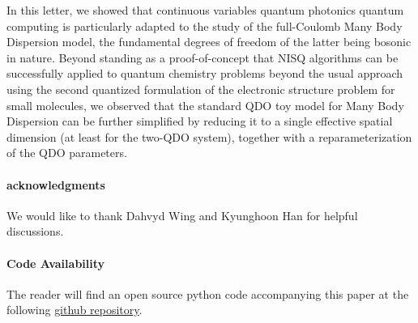\documentclass[reprint, amsmath, amssymb, aps, pra]{revtex4-2}
\begin{document}
    In this letter, we showed that continuous variables quantum photonics quantum computing is particularly adapted to the study of the full-Coulomb Many Body Dispersion model, the fundamental degrees of freedom of the latter being bosonic in nature. Beyond standing as a proof-of-concept that NISQ algorithms can be successfully applied to quantum chemistry problems beyond the usual approach using the second quantized formulation of the electronic structure problem for small molecules, we observed that the standard QDO toy model for Many Body Dispersion can be further simplified by reducing it to a single effective spatial dimension (at least for the two-QDO system), together with a reparameterization of the QDO parameters.
    \newline

\paragraph*{acknowledgments}

    We would like to thank Dahvyd Wing and Kyunghoon Han for helpful discussions.
    \newline

\paragraph*{Code Availability}

The reader will find an open source python code accompanying this paper at the following \href{https://github.com/MatthieuSarkis/qdo}{github repository}.

\appendix

\nocite{*}


\end{document}
